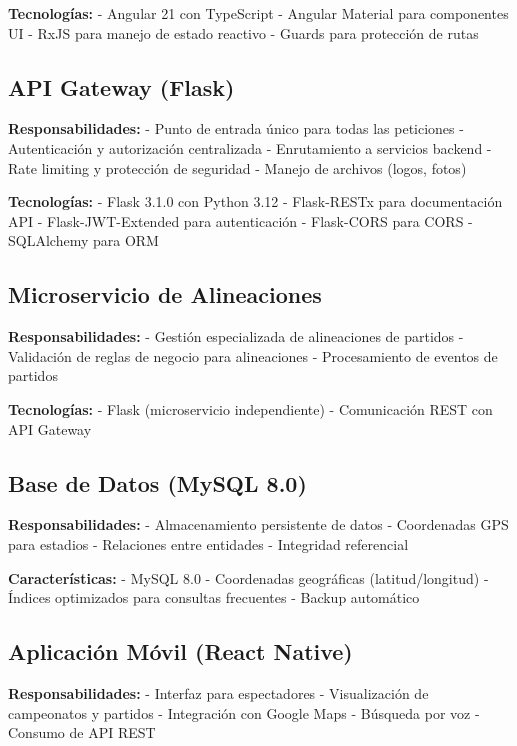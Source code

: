 \documentclass[
  spanish,
  11pt,
  letterpaper,
]{book}
\begin{document}
\textbf{Tecnologías:} - Angular 21 con TypeScript - Angular Material
para componentes UI - RxJS para manejo de estado reactivo - Guards para
protección de rutas

\subsection{API Gateway (Flask)}\label{api-gateway-flask}

\textbf{Responsabilidades:} - Punto de entrada único para todas las
peticiones - Autenticación y autorización centralizada - Enrutamiento a
servicios backend - Rate limiting y protección de seguridad - Manejo de
archivos (logos, fotos)

\textbf{Tecnologías:} - Flask 3.1.0 con Python 3.12 - Flask-RESTx para
documentación API - Flask-JWT-Extended para autenticación - Flask-CORS
para CORS - SQLAlchemy para ORM

\subsection{Microservicio de
Alineaciones}\label{microservicio-de-alineaciones}

\textbf{Responsabilidades:} - Gestión especializada de alineaciones de
partidos - Validación de reglas de negocio para alineaciones -
Procesamiento de eventos de partidos

\textbf{Tecnologías:} - Flask (microservicio independiente) -
Comunicación REST con API Gateway

\subsection{Base de Datos (MySQL 8.0)}\label{base-de-datos-mysql-8.0}

\textbf{Responsabilidades:} - Almacenamiento persistente de datos -
Coordenadas GPS para estadios - Relaciones entre entidades - Integridad
referencial

\textbf{Características:} - MySQL 8.0 - Coordenadas geográficas
(latitud/longitud) - Índices optimizados para consultas frecuentes -
Backup automático

\subsection{Aplicación Móvil (React
Native)}\label{aplicaciuxf3n-muxf3vil-react-native}

\textbf{Responsabilidades:} - Interfaz para espectadores - Visualización
de campeonatos y partidos - Integración con Google Maps - Búsqueda por
voz - Consumo de API REST
\end{document}
